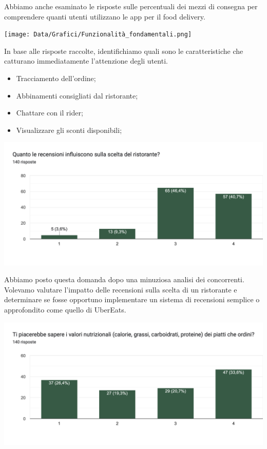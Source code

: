 \documentclass{article}
\begin{document}
\par Abbiamo anche esaminato le risposte sulle percentuali dei mezzi di consegna per comprendere quanti utenti utilizzano le app per il food delivery.\par \vspace{1cm}
\texttt{[image: Data/Grafici/Funzionalità\_fondamentali.png]}\par
In base alle risposte raccolte, identifichiamo quali sono le caratteristiche che catturano immediatamente l'attenzione degli utenti.
\par \begin{itemize}
    \item Tracciamento dell'ordine;
    \item Abbinamenti consigliati dal ristorante;
    \item Chattare con il rider;
    \item Visualizzare gli sconti disponibili;
\end{itemize}   \vspace{1cm} \par
\includegraphics[width=\textwidth]{Data/Grafici/recensioni_influiscono.png}
\par Abbiamo posto questa domanda dopo una minuziosa analisi dei concorrenti. Volevamo valutare l'impatto delle recensioni sulla scelta di un ristorante e determinare se fosse opportuno implementare un sistema di recensioni semplice o approfondito come quello di UberEats.
    \par \vspace{1cm}\includegraphics[width=\textwidth]{Data/Grafici/Valori_nutrizionali.png}\par
\end{document}
